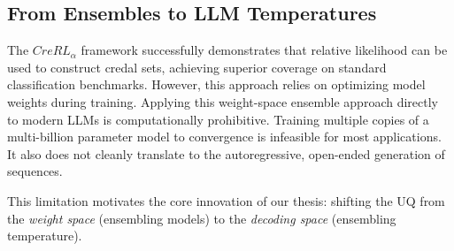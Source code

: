 \subsection{From Ensembles to LLM Temperatures}
\label{sec:related_work:credal_prediction:bridge}
The $CreRL_\alpha$ framework successfully demonstrates that relative
likelihood can be used to construct credal sets, achieving
superior coverage on standard classification benchmarks. However, this
approach relies on optimizing model weights during training.
Applying this weight-space ensemble approach directly to modern LLMs 
is computationally prohibitive. Training multiple copies of a 
multi-billion parameter model to convergence is infeasible for most
applications. It also does not cleanly translate to the autoregressive,
open-ended generation of sequences.

This limitation motivates the core innovation of our thesis: shifting 
the UQ from the \textit{weight space}
(ensembling models) to the \textit{decoding space} 
(ensembling temperature).
